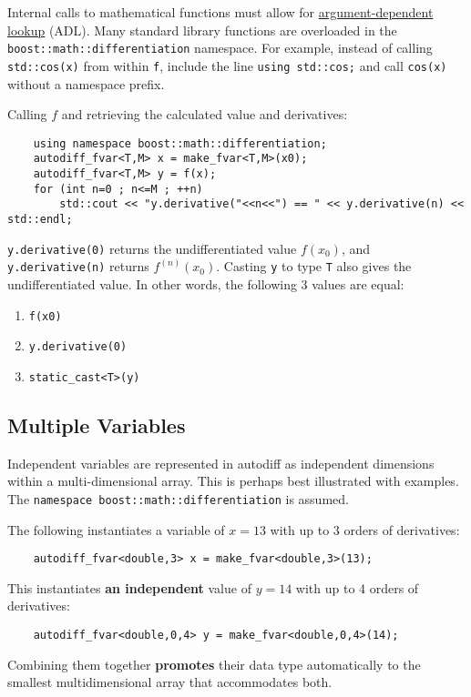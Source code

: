 \documentclass{article}
\begin{document}
Internal calls to mathematical functions must allow for
\href{https://en.cppreference.com/w/cpp/language/adl}{argument-dependent lookup} (ADL). Many standard library functions
are overloaded in the {\tt boost::math::differentiation} namespace. For example, instead of calling {\tt std::cos(x)}
from within {\tt f}, include the line {\tt using std::cos;} and call {\tt cos(x)} without a namespace prefix.

Calling $f$ and retrieving the calculated value and derivatives:

\begin{verbatim}
    using namespace boost::math::differentiation;
    autodiff_fvar<T,M> x = make_fvar<T,M>(x0);
    autodiff_fvar<T,M> y = f(x);
    for (int n=0 ; n<=M ; ++n)
        std::cout << "y.derivative("<<n<<") == " << y.derivative(n) << std::endl;
\end{verbatim}
{\tt y.derivative(0)} returns the undifferentiated value $f(x_0)$, and {\tt y.derivative(n)} returns $f^{(n)}(x_0)$.
Casting {\tt y} to type {\tt T} also gives the undifferentiated value. In other words, the following 3 values
are equal:

\begin{enumerate}
\item {\tt f(x0)}
\item {\tt y.derivative(0)}
\item {\tt static\_cast<T>(y)}
\end{enumerate}

\subsection{Multiple Variables}

Independent variables are represented in autodiff as independent dimensions within a multi-dimensional array.
This is perhaps best illustrated with examples. The {\tt namespace boost::math::differentiation} is assumed.

The following instantiates a variable of $x=13$ with up to 3 orders of derivatives:

\begin{verbatim}
    autodiff_fvar<double,3> x = make_fvar<double,3>(13);
\end{verbatim}
This instantiates {\bf an independent} value of $y=14$ with up to 4 orders of derivatives:

\begin{verbatim}
    autodiff_fvar<double,0,4> y = make_fvar<double,0,4>(14);
\end{verbatim}
Combining them together {\bf promotes} their data type automatically to the smallest multidimensional array that
accommodates both.
\end{document}
